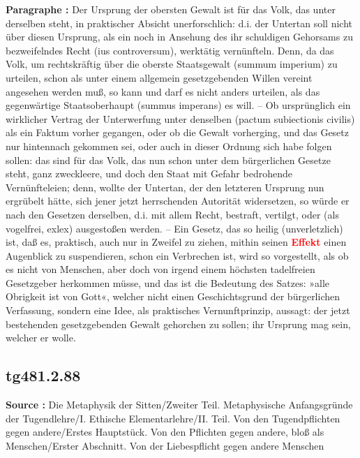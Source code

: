 \documentclass[a4paper,12pt,twoside]{book}
\newcommand{\match}[1]{\textcolor{red}{\textbf{#1}}}
\begin{document}
	\textbf{Paragraphe : }Der Ursprung der obersten Gewalt ist für das Volk, das unter derselben steht, in praktischer Absicht unerforschlich: d.i. der Untertan soll nicht über diesen Ursprung, als ein noch in Ansehung des ihr schuldigen Gehorsams zu bezweifelndes Recht (ius controversum), werktätig vernünfteln. Denn, da das Volk, um rechtskräftig über die oberste Staatsgewalt (summum imperium) zu urteilen, schon als unter einem allgemein gesetzgebenden Willen vereint angesehen werden muß, so kann und darf es nicht anders urteilen, als das gegenwärtige Staatsoberhaupt (summus imperans) es will. – Ob ursprünglich ein wirklicher Vertrag der Unterwerfung unter denselben (pactum subiectionis  civilis) als ein Faktum vorher gegangen, oder ob die Gewalt vorherging, und das Gesetz nur hintennach gekommen sei, oder auch in dieser Ordnung sich habe folgen sollen: das sind für das Volk, das nun schon unter dem bürgerlichen Gesetze steht, ganz zweckleere, und doch den Staat mit Gefahr bedrohende Vernünfteleien; denn, wollte der Untertan, der den letzteren Ursprung nun ergrübelt hätte, sich jener jetzt herrschenden Autorität widersetzen, so würde er nach den Gesetzen derselben, d.i. mit allem Recht, bestraft, vertilgt, oder (als vogelfrei, exlex) ausgestoßen werden. – Ein Gesetz, das so heilig (unverletzlich) ist, daß es, praktisch, auch nur in Zweifel zu ziehen, mithin seinen \match{Effekt} einen Augenblick zu suspendieren, schon ein Verbrechen ist, wird so vorgestellt, als ob es nicht von Menschen, aber doch von irgend einem höchsten tadelfreien Gesetzgeber herkommen müsse, und das ist die Bedeutung des Satzes: »alle Obrigkeit ist von Gott«, welcher nicht einen Geschichtsgrund der bürgerlichen Verfassung, sondern eine Idee, als praktisches Vernunftprinzip, aussagt: der jetzt bestehenden gesetzgebenden Gewalt gehorchen zu sollen; ihr Ursprung mag sein, welcher er wolle. 
	
	\subsection*{tg481.2.88} 
	\textbf{Source : }Die Metaphysik der Sitten/Zweiter Teil. Metaphysische Anfangsgründe der Tugendlehre/I. Ethische Elementarlehre/II. Teil. Von den Tugendpflichten gegen andere/Erstes Hauptstück. Von den Pflichten gegen andere, bloß als Menschen/Erster Abschnitt. Von der Liebespflicht gegen andere Menschen\\  
	
\end{document}
